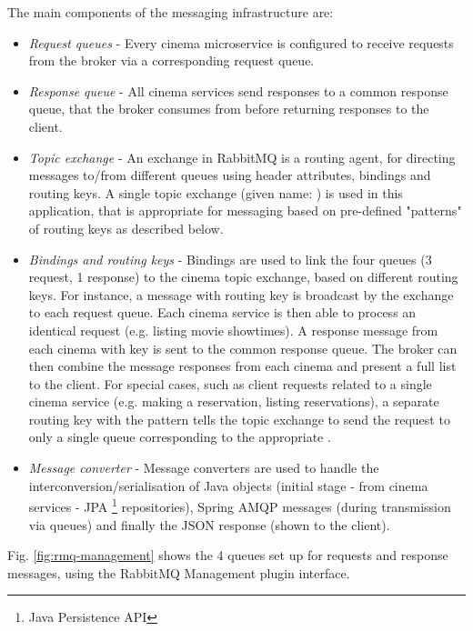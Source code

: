 The main components of the messaging infrastructure are:
\begin{itemize}
  \item \textit{Request queues} - Every cinema microservice is configured to receive requests from the broker via a corresponding request queue.
  \item \textit{Response queue} - All cinema services send responses to a common response queue, that the broker consumes from before returning responses to the client.
  \item \textit{Topic exchange} - An exchange in RabbitMQ is a routing agent, for directing messages to/from different queues using header attributes, bindings and routing keys. A single topic exchange (given name: ) is used in this application, that is appropriate for messaging based on pre-defined "patterns" of routing keys as described below.
  \item \textit{Bindings and routing keys} - Bindings are used to link the four queues (3 request, 1 response) to the cinema topic exchange, based on different routing keys. For instance, a message with routing key  is broadcast by the exchange to each request queue. Each cinema service is then able to process an identical request (e.g. listing movie showtimes). A response message from each cinema with key  is sent to the common response queue. The broker can then combine the message responses from each cinema and present a full list to the client. For special cases, such as client requests related to a single cinema service (e.g. making a reservation, listing reservations), a separate routing key with the pattern  tells the topic exchange to send the request to only a single queue corresponding to the appropriate .
  \item \textit{Message converter} - Message converters are used to handle the interconversion/serialisation of Java objects (initial stage - from cinema services - JPA \footnote{Java Persistence API} repositories), Spring AMQP messages (during transmission via queues) and finally the JSON response (shown to the client).
\end{itemize}

Fig. \ref{fig:rmq-management} shows the 4 queues set up for requests and response messages, using the RabbitMQ Management plugin interface.

